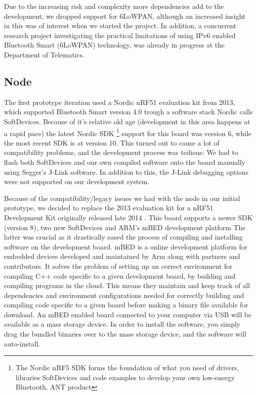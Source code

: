 Due to the increasing risk and complexity more dependencies add to the development, we dropped support for 6LoWPAN, although an increased insight in this was of interest when we started the project. In addition, a concurrent research project investigating the practical limitations of using IPv6 enabled Bluetooth Smart (6LoWPAN) technology, was already in progress at the Department of Telematics.


\subsection{Node} %
\label{sub:node}

The first prototype iteration used a Nordic nRF51 evaluation kit from 2013, which supported Bluetooth Smart version 4.0 trough a software stack Nordic calls SoftDevices. Because of it's relative old age (development in this area happens at a rapid pace) the latest Nordic SDK \footnote{The Nordic nRF5 SDK forms the foundation of what you need of drivers, libraries SoftDevices and code examples to develop your own low-energy Bluetooth, ANT product} support for this board was version 6, while the most recent SDK is at version 10. This turned out to cause a lot of compatibility problems, and the development process was tedious: We had to flash both SoftDevices and our own compiled software onto the board manually using Segger's J-Link software. In addition to this, the J-Link debugging options were not supported on our development system.

Because of the compatibility/legacy issues we had with the node in our initial prototype, we decided to replace the 2013 evaluation kit for a nRF51 Development Kit originally released late 2014 \cite{newRef_53}. This board supports a newer SDK (version 8), two new SoftDevices and ARM's mBED development platform \cite{newRef_54} The latter was crucial as it drastically eased the process of compiling and installing software on the development board. mBED is a online development platform for embedded devices developed and maintained by Arm \cite{newRef_55} along with partners and contributors. It solves the problem of setting up an correct environment for compiling C++ code specific to a given development board, by building and compiling programs in the cloud. This means they maintain and keep track of all dependencies and environment configurations needed for correctly building and compiling code specific to a given board before making a binary file available for download. An mBED enabled board connected to your computer via USB will be available as a mass storage device. In order to install the software, you simply drag the bundled binaries over to the mass storage device, and the software will auto-install. 


